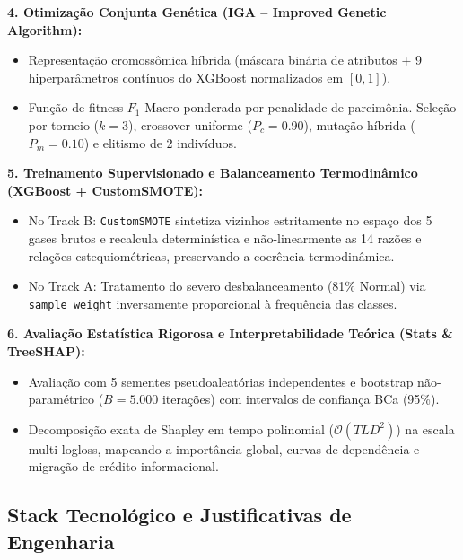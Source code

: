 \documentclass[10pt,a4paper]{article}
\begin{document}
\begin{archbox}
\textbf{4. Otimização Conjunta Genética (IGA -- Improved Genetic Algorithm):}
\begin{itemize}[leftmargin=*,itemsep=0pt]
  \item Representação cromossômica híbrida (máscara binária de atributos + 9 hiperparâmetros contínuos do XGBoost normalizados em $[0, 1]$).
  \item Função de fitness $F_1\text{-Macro}$ ponderada por penalidade de parcimônia. Seleção por torneio ($k=3$), crossover uniforme ($P_c=0.90$), mutação híbrida ($P_m=0.10$) e elitismo de 2 indivíduos.
\end{itemize}

\textbf{5. Treinamento Supervisionado e Balanceamento Termodinâmico (XGBoost + CustomSMOTE):}
\begin{itemize}[leftmargin=*,itemsep=0pt]
  \item No Track B: \texttt{CustomSMOTE} sintetiza vizinhos estritamente no espaço dos 5 gases brutos e recalcula determinística e não-linearmente as 14 razões e relações estequiométricas, preservando a coerência termodinâmica.
  \item No Track A: Tratamento do severo desbalanceamento (81\% Normal) via \texttt{sample\_weight} inversamente proporcional à frequência das classes.
\end{itemize}

\textbf{6. Avaliação Estatística Rigorosa e Interpretabilidade Teórica (Stats \& TreeSHAP):}
\begin{itemize}[leftmargin=*,itemsep=0pt]
  \item Avaliação com 5 sementes pseudoaleatórias independentes e bootstrap não-paramétrico ($B=5.000$ iterações) com intervalos de confiança BCa (95\%).
  \item Decomposição exata de Shapley em tempo polinomial ($\mathcal{O}(TLD^2)$) na escala multi-logloss, mapeando a importância global, curvas de dependência e migração de crédito informacional.
\end{itemize}
\end{archbox}

\subsection{Stack Tecnológico e Justificativas de Engenharia}
\end{document}
